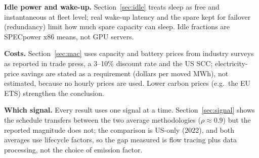 \documentclass[acmsmall,review,anonymous]{acmart}
\theoremstyle{definition}
\begin{document}
\textbf{Idle power and wake-up.} Section~\ref{sec:idle} treats sleep as free and
instantaneous at fleet level; real wake-up latency and the spare kept for failover
(redundancy) limit how much spare capacity can sleep. Idle fractions are SPECpower x86 means,
not GPU servers.

\textbf{Costs.} Section~\ref{sec:mac} uses capacity and battery prices from industry
surveys as reported in trade press, a 3--10\% discount rate and the US SCC; electricity-price
savings are stated as a requirement (dollars per moved MWh), not estimated, because no hourly
prices are used. Lower carbon prices (e.g.\ the EU ETS) strengthen the conclusion.

\textbf{Which signal.} Every result uses one signal at a time. Section~\ref{sec:signal} shows the
schedule transfers between the two average methodologies ($\rho\approx0.9$) but the reported
magnitude does not; the comparison is US-only (2022), and both averages use lifecycle factors,
so the gap measured is flow tracing plus data processing, not the choice of emission factor.
\end{document}
